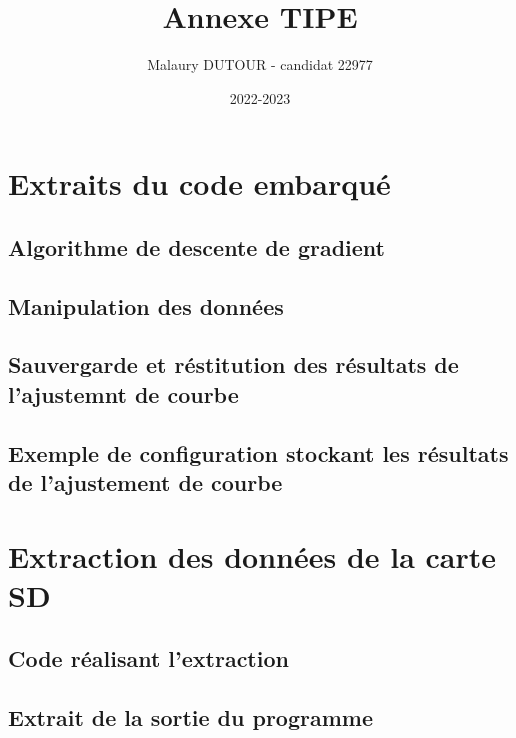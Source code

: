\documentclass{article}
\title{Annexe TIPE}
\author{Malaury DUTOUR - candidat 22977}
\date{2022-2023}
\begin{document}
\maketitle
\tableofcontents

\section{Extraits du code embarqué}
\subsection{Algorithme de descente de gradient}

\subsection{Manipulation des données}

\subsection{Sauvergarde et réstitution des résultats de l'ajustemnt de courbe}

\subsection{Exemple de configuration stockant les résultats de l'ajustement de courbe}


\section{Extraction des données de la carte SD}
\subsection{Code réalisant l'extraction}

\subsection{Extrait de la sortie du programme}

\end{document}
